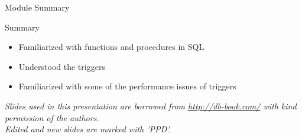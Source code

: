\documentclass[aspectratio=169, xcolor=dvipsnames]{beamer}
\begin{document}
\begin{frame}{Module Summary}
    \begin{block}{Summary}
        \begin{itemize}[<+->]
            \item Familiarized with functions and procedures in SQL
            \item Understood the triggers
            \item Familiarized with some of the performance issues of triggers
        \end{itemize}
    \end{block}
    \vspace{2em}
    \begin{center}
    \small \textit{Slides used in this presentation are borrowed from \url{http://db-book.com/} with kind permission of the authors.} \\
    \small \textit{Edited and new slides are marked with 'PPD'.}
    \end{center}
\end{frame}
\end{document}
